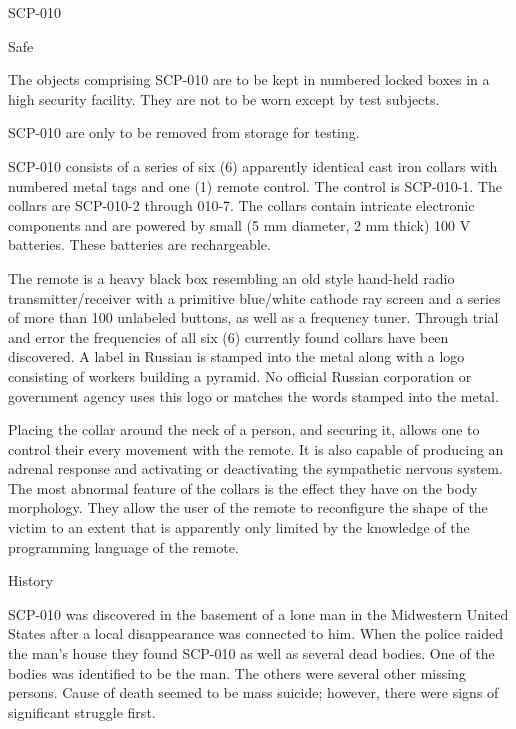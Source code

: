  SCP-010

 Safe

 The objects comprising SCP-010 are to be kept in numbered locked boxes in a high security facility. They are not to be worn except by test subjects.

SCP-010 are only to be removed from storage for testing.

 SCP-010 consists of a series of six (6) apparently identical cast iron collars with numbered metal tags and one (1) remote control. The control is SCP-010-1. The collars are SCP-010-2 through 010-7. The collars contain intricate electronic components and are powered by small (5 mm diameter, 2 mm thick) 100 V batteries. These batteries are rechargeable.

The remote is a heavy black box resembling an old style hand-held radio transmitter/receiver with a primitive blue/white cathode ray screen and a series of more than 100 unlabeled buttons, as well as a frequency tuner. Through trial and error the frequencies of all six (6) currently found collars have been discovered. A label in Russian is stamped into the metal along with a logo consisting of workers building a pyramid. No official Russian corporation or government agency uses this logo or matches the words stamped into the metal.

Placing the collar around the neck of a person, and securing it, allows one to control their every movement with the remote. It is also capable of producing an adrenal response and activating or deactivating the sympathetic nervous system. The most abnormal feature of the collars is the effect they have on the body morphology. They allow the user of the remote to reconfigure the shape of the victim to an extent that is apparently only limited by the knowledge of the programming language of the remote.

 History

SCP-010 was discovered in the basement of a lone man in the Midwestern United States after a local disappearance was connected to him. When the police raided the man's house they found SCP-010 as well as several dead bodies. One of the bodies was identified to be the man. The others were several other missing persons. Cause of death seemed to be mass suicide; however, there were signs of significant struggle first.

